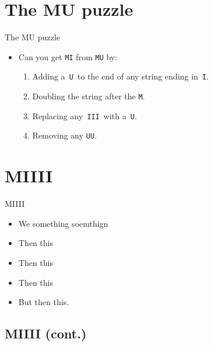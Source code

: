 \documentclass[aspectratio=32]{beamer}
\providecommand{\tightlist}{\setlength{\itemsep}{0pt}\setlength{\parskip}{0pt}}
\begin{document}
  \section{\texorpdfstring{\textbar{} The MU puzzle
  \autocite{hofstadter2000}}{\textbar{} The MU puzzle {[}@hofstadter2000{]}}}\label{the-mu-puzzle-hofstadter2000}

  \begin{frame}{\textbar{} The MU puzzle
  \autocite{hofstadter2000}}
  \begin{itemize}
  \tightlist
  \item
    Can you get \texttt{MI} from
    \texttt{MU} by:

    \begin{enumerate}
    \tightlist
    \item
      Adding a~\texttt{U}~to the end of any string
      ending in~\texttt{I}.
    \item
      Doubling the string after the \texttt{M}.
    \item
      Replacing any~\texttt{III}~with
      a~\texttt{U}.
    \item
      Removing any \texttt{UU}.
    \end{enumerate}
  \end{itemize}
  \end{frame}

  \section{\textbar{} MIIII}\label{miiii}

  \begin{frame}[allowframebreaks]{\textbar{} MIIII}
  \begin{itemize}
  \tightlist
  \item
    We something soemthign
  \item
    Then this
  \item
    Then this
  \item
    Then this
  \end{itemize}

  \framebreak

  \begin{itemize}
  \tightlist
  \item
    But then this.
  \end{itemize}
  \end{frame}

  \subsection{\textbar{} MIIII (cont.)}\label{miiii-cont.}
\end{document}
